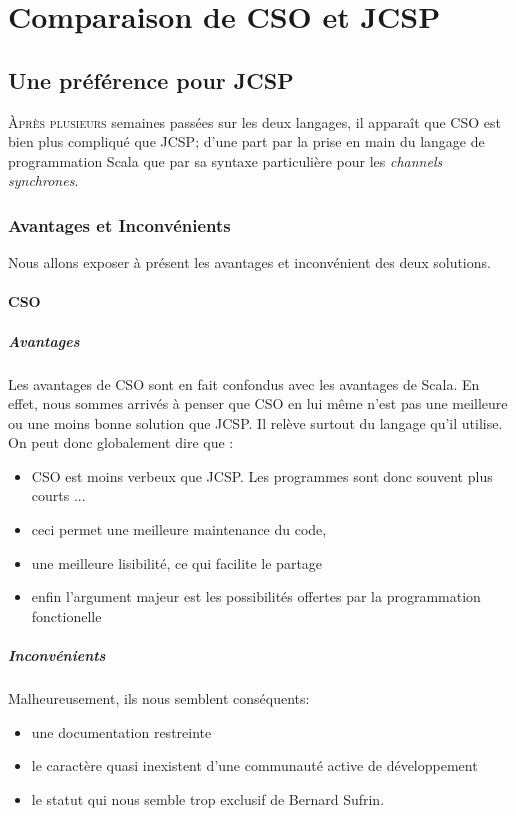 \documentclass[a4paper,11pt,french]{report}
\begin{document}
\part{Comparaison de CSO et JCSP}
\chapter{Une préférence pour JCSP}

\lettrine{\`A}{près plusieurs} semaines passées sur les deux langages, il appara\^it que CSO est bien plus compliqué que JCSP; d'une part par la prise en main du langage de programmation Scala que par sa syntaxe particulière pour les \emph{channels synchrones}.\\

\section{Avantages et Inconvénients}
Nous allons exposer à présent les avantages et inconvénient des deux solutions.

\subsection{CSO}
\subsubsection{Avantages}
Les avantages de CSO sont en fait confondus avec les avantages de Scala. En effet, nous sommes arrivés à penser que CSO en lui m\^eme n'est pas une meilleure ou une moins bonne solution que JCSP. Il relève surtout du langage qu'il utilise. On peut donc globalement dire que :
\begin{itemize}
\item CSO est moins verbeux que JCSP. Les programmes sont donc souvent plus courts ...
\item ceci permet une meilleure maintenance du code,
\item une meilleure lisibilité, ce qui facilite le partage
\item enfin l'argument majeur est les possibilités offertes par la programmation fonctionelle
\end{itemize}

\subsubsection{Inconvénients}
Malheureusement, ils nous semblent conséquents:
 \begin{itemize}
\item une documentation restreinte
\item le caractère quasi inexistent d'une communauté active de développement
\item le statut qui nous semble trop exclusif de Bernard Sufrin.
\end{itemize}
\end{document}
